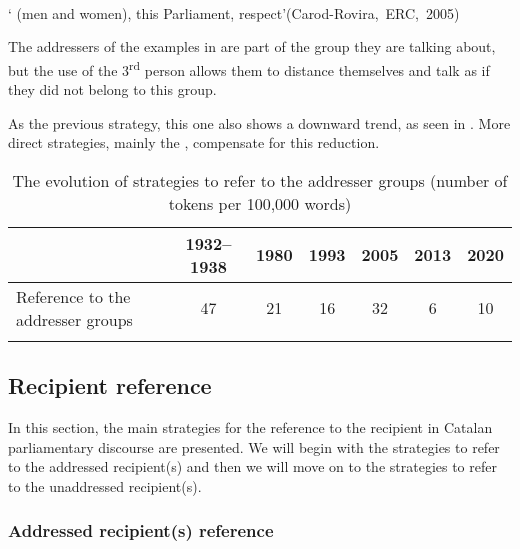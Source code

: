 \documentclass[output=paper]{langscibook}
\begin{document}
 \ex\label{ex:nogue:15b}
{ }\\


\glt `     (men and women), this Parliament,  respect'\hfill\hbox{(Carod-Rovira, ERC, 2005)}\\
\z 
\z 


The addressers of the examples in  are part of the group they are talking about, but the use of the 3\textsuperscript{rd} person allows them to distance themselves and talk as if they did not belong to this group.



As the previous strategy, this one also shows a downward trend, as seen in . More direct strategies, mainly the , compensate for this reduction.\largerpage


\begin{table}[H]
\begin{tabularx}{\textwidth}{Qcccccc} 
\lsptoprule
& {{1932–1938}} & {{1980}} & {{1993}} & {{2005}} & {{2013}} & {{2020}}\\
\midrule
Reference to the addresser groups & {47} & {21} & {16} & {32} & {6} &{10}\\
\lspbottomrule
\end{tabularx}
\caption{The evolution of  strategies to refer to the addresser groups (number of tokens per 100,000 words)}
\label{tab:nogue:6}
\end{table}

\subsection{Recipient reference}\label{sec:nogue:2.2}



In this section, the main strategies for the reference to the recipient in Catalan parliamentary discourse are presented. We will begin with the strategies to refer to the addressed recipient(s) and then we will move on to the strategies to refer to the unaddressed recipient(s).



\subsubsection{Addressed recipient(s) reference}\label{sec:nogue:2.2.1}
\end{document}
